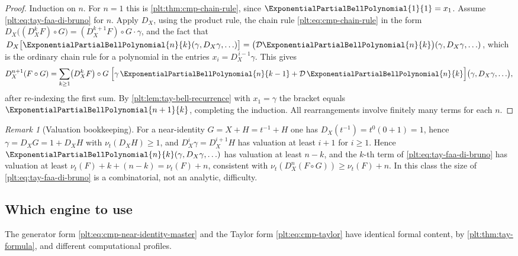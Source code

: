 \documentclass[11pt,oneside]{article}
\theoremstyle{plain}
\theoremstyle{definition}
\theoremstyle{remark}
\newtheorem{remark}[theorem]{Remark}
\newcommand{\ordt}{\nu_{t}}                              %
\newcommand{\DX}{D_{X}}                                  %
\newcommand{\compose}{\mathbin{\circ}}
\begin{document}
\begin{proof}
Induction on \(n\).  For \(n=1\) this is
\cref{plt:thm:cmp-chain-rule}, since
\(\ExponentialPartialBellPolynomial{1}{1}=x_{1}\).  Assume
\eqref{plt:eq:tay-faa-di-bruno} for \(n\).  Apply \(\DX\), using the product
rule, the chain rule \eqref{plt:eq:cmp-chain-rule} in the form
\(\DX\bigl((\DX^{k}F)\compose G\bigr)=(\DX^{k+1}F)\compose G\cdot\gamma\), and
the fact that
\(\DX\bigl[\ExponentialPartialBellPolynomial{n}{k}(\gamma,\DX\gamma,\ldots)\bigr]
 =\bigl(\mathcal D\ExponentialPartialBellPolynomial{n}{k}\bigr)
   (\gamma,\DX\gamma,\ldots)\),
which is the ordinary chain rule for a polynomial in the entries
\(x_{i}=\DX^{\,i-1}\gamma\).  This gives
\[
 \DX^{n+1}(F\compose G)
 =\sum_{k\ge1}\bigl(\DX^{k}F\bigr)\compose G\;
  \Bigl[\gamma\,\ExponentialPartialBellPolynomial{n}{k-1}
        +\mathcal D\,\ExponentialPartialBellPolynomial{n}{k}\Bigr]
   \bigl(\gamma,\DX\gamma,\ldots\bigr),
\]
after re-indexing the first sum.  By
\cref{plt:lem:tay-bell-recurrence} with \(x_{1}=\gamma\) the bracket equals
\(\ExponentialPartialBellPolynomial{n+1}{k}\), completing the induction.  All
rearrangements involve finitely many terms for each \(n\).
\end{proof}

\begin{remark}[Valuation bookkeeping]
For a near-identity \(G=X+H=t^{-1}+H\) one has
\(\DX(t^{-1})=t^{0}(0+1)=1\), hence \(\gamma=\DX G=1+\DX H\) with
\(\ordt(\DX H)\ge1\), and \(\DX^{i}\gamma=\DX^{i+1}H\) has
valuation at least \(i+1\) for \(i\ge1\).  Hence
\(\ExponentialPartialBellPolynomial{n}{k}(\gamma,\DX\gamma,\ldots)\) has
valuation at least \(n-k\), and the \(k\)-th term of
\eqref{plt:eq:tay-faa-di-bruno} has valuation at least
\(\ordt(F)+k+(n-k)=\ordt(F)+n\), consistent with
\(\ordt(\DX^{n}(F\compose G))\ge\ordt(F)+n\).  In this class the size of
\eqref{plt:eq:tay-faa-di-bruno} is a combinatorial, not an analytic,
difficulty.
\end{remark}

\subsection{Which engine to use}
\label{plt:sec:tay-comparison}

The generator form \eqref{plt:eq:cmp-near-identity-master} and the Taylor form
\eqref{plt:eq:cmp-taylor} have identical formal content, by
\cref{plt:thm:tay-formula}, and different computational profiles.
\end{document}
